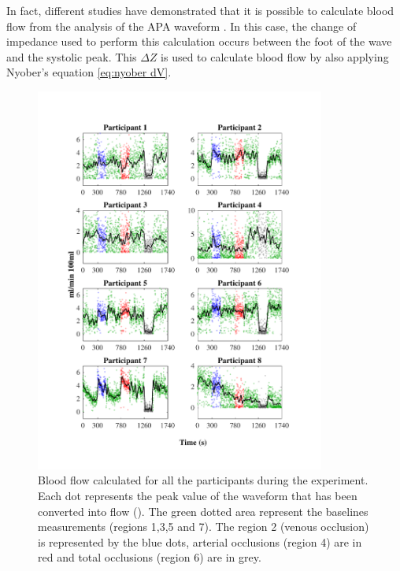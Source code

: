 In fact, different studies have demonstrated that it is possible to calculate blood flow from the analysis of the APA waveform \cite{corciova2011peripheral, costeloe1980continuous, brown1975impedance}. In this case, the change of impedance used to perform this calculation occurs between the foot of the wave and the systolic peak. This $\Delta Z$ is used to calculate blood flow by also applying Nyober's equation \ref{eq:nyober dV}.

\begin{figure}[!htbp]
	\centering
	\includegraphics[width=0.85\textwidth,trim={1.5cm 0.5cm 1.5cm 1.5cm},clip]{figure_apa_8}
	\caption[Blood flow calculated from impedance plethysmography waveform at the time of the whole expetiment]{Blood flow calculated for all the participants during the experiment. Each dot represents the peak value of the waveform that has been converted into flow (\si{\bfv}). The green dotted area represent the baselines measurements (regions 1,3,5 and 7). The region 2 (venous occlusion) is represented by the blue dots, arterial occlusions (region 4) are in red and total occlusions (region 6) are in grey.}
	\label{fig:blood_flow_plethysmography}
\end{figure}

